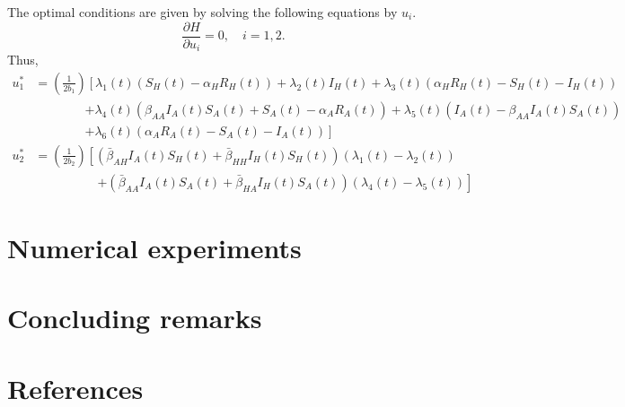 \documentclass[3p,sort&compress]{elsarticle}
\DeclareRobustCommand{\1}[1]{\ensuremath \mathbbm{1}_{\{#1\}}}
\begin{document}
    The optimal conditions are given by solving the following equations by $u_{i}$. 
    \begin{equation*}
        \frac{\partial H}{\partial u_{i}} = 0,\quad i=1,2.
    \end{equation*}
    Thus,
    \begin{equation*}
        \begin{aligned}
        u_{1}^{*} &= \left(\frac{1}{2b_{1}}\right)
        \left[ 
            \lambda_{1}(t)
            \left(
            S_{H}(t) - \alpha_{H} R_{H}(t)
            \right)    
            + 
            \lambda_{2}(t) I_{H}(t)
            + 
            \lambda_{3}(t)
            \left(
            \alpha_{H} R_{H}(t) - S_{H}(t) - I_{H}(t)
            \right)
            \right.\\
            &\quad\quad\quad\quad \left.
            + 
            \lambda_{4}(t)
            \left(
                \beta_{AA} I_{A}(t) S_{A}(t) + S_{A}(t) - \alpha_{A}R_{A}(t)
            \right)
            + 
            \lambda_{5}(t)
            \left(
                I_{A}(t) - \beta_{AA} I_{A}(t) S_{A}(t)
            \right)
            \right.\\
            &\quad\quad\quad\quad \left.            
            +
            \lambda_{6}(t)
            \left(
                \alpha_{A} R_{A}(t) - S_{A}(t) - I_{A}(t)
            \right)
        \right]\\[0.2cm]
        u_{2}^{*} &= \left(\frac{1}{2b_{2}}\right)
        \left[
            \left(
                \bar{\beta}_{AH} I_{A}(t) S_{H}(t)
                + 
                \bar{\beta}_{HH} I_{H}(t) S_{H}(t)
            \right)
            \left(
                \lambda_{1}(t) - \lambda_{2}(t)
            \right)
            \right.\\
            &\quad\quad\quad\quad\quad \left.            
            +
            \left(
                \bar{\beta}_{AA} I_{A}(t) S_{A}(t)
                +
                \bar{\beta}_{HA} I_{H}(t) S_{A}(t)
            \right)
            \left(
                \lambda_{4}(t) - \lambda_{5}(t)
            \right)
        \right]
        \end{aligned}
    \end{equation*}
    \section{Numerical experiments}
    \section{Concluding remarks}
%    
    \section*{References}
    
    
\end{document}
